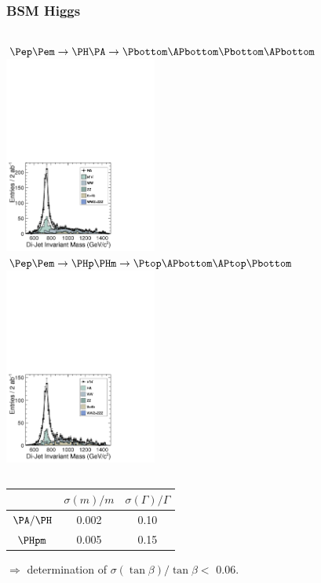 \documentclass{beamer}
\begin{document}
\begin{frame}
\frametitle{BSM Higgs}
\begin{columns}[c]
\column{6cm}
$\Pep\Pem \to \PH\PA \to \Pbottom\APbottom\Pbottom\APbottom$\\
\includegraphics[width=5cm]{HAMass742_Bkg_CKFM_00BX_FJ.pdf}
\column{6cm}
$\Pep\Pem \to \PHp\PHm \to \Ptop\APbottom\APtop\Pbottom$
\includegraphics[width=5cm]{Hpm_Mass742_Bkg_CKFM_00BX_FJ.pdf}
\end{columns}
\begin{center}
\begin{tabular}{ccc}
\toprule
~ & $\sigma(m)/m$ & $\sigma(\Gamma)/\Gamma$\\
\midrule
$\PA/\PH$ & 0.002 & 0.10\\
$\PHpm$ & 0.005 & 0.15\\
\bottomrule
\end{tabular}
\end{center}
$\Rightarrow$ determination of $\sigma(\tan \beta)/\tan \beta <$ 0.06.
\end{frame}
\end{document}
